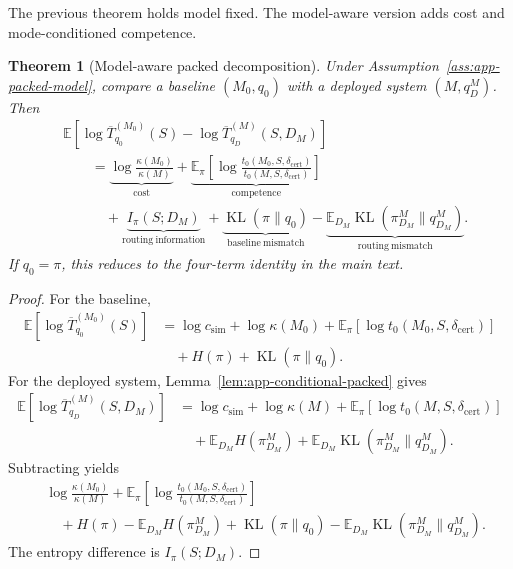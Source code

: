 \documentclass{article}
\newtheorem{theorem}{Theorem}
\DeclareMathOperator{\KL}{KL}
\newcommand{\E}{\mathbb{E}}
\begin{document}
The previous theorem holds model fixed.
The model-aware version adds cost and mode-conditioned competence.

\begin{theorem}[Model-aware packed decomposition]
\label{thm:app-model-aware}
Under Assumption~\ref{ass:app-packed-model}, compare a baseline \((M_0,q_0)\) with a
deployed system \((M,q_D^M)\).
Then
\[
\boxed{
\begin{aligned}
&\E\!\left[
    \log \overline T^{(M_0)}_{q_0}(S)
    -
    \log \overline T^{(M)}_{q_D}(S,D_M)
\right]
\\
&\qquad =
\underbrace{\log\frac{\kappa(M_0)}{\kappa(M)}}_{\mathrm{cost}}
+
\underbrace{
\E_\pi
\left[
    \log\frac{t_0(M_0,S,\delta_{\mathrm{cert}})}
              {t_0(M,S,\delta_{\mathrm{cert}})}
\right]
}_{\mathrm{competence}}
\\
&\qquad\quad
+
\underbrace{I_\pi(S;D_M)}_{\mathrm{routing\ information}}
+
\underbrace{\KL(\pi\|q_0)}_{\mathrm{baseline\ mismatch}}
-
\underbrace{\E_{D_M}\KL(\pi_{D_M}^M\|q_{D_M}^M)}_{\mathrm{routing\ mismatch}} .
\end{aligned}
}
\]
If \(q_0=\pi\), this reduces to the four-term identity in the main text.
\end{theorem}

\begin{proof}
For the baseline,
\[
\begin{aligned}
    \E[\log \overline T^{(M_0)}_{q_0}(S)]
    &=
    \log c_{\mathrm{sim}}
    +
    \log\kappa(M_0)
    +
    \E_\pi[\log t_0(M_0,S,\delta_{\mathrm{cert}})]
    \\
    &\quad
    +
    H(\pi)
    +
    \KL(\pi\|q_0).
\end{aligned}
\]
For the deployed system, Lemma~\ref{lem:app-conditional-packed} gives
\[
\begin{aligned}
    \E[\log \overline T^{(M)}_{q_D}(S,D_M)]
    &=
    \log c_{\mathrm{sim}}
    +
    \log\kappa(M)
    +
    \E_\pi[\log t_0(M,S,\delta_{\mathrm{cert}})]
    \\
    &\quad
    +
    \E_{D_M}H(\pi_{D_M}^M)
    +
    \E_{D_M}\KL(\pi_{D_M}^M\|q_{D_M}^M).
\end{aligned}
\]
Subtracting yields
\[
\begin{aligned}
&\log\frac{\kappa(M_0)}{\kappa(M)}
+
\E_\pi
\left[
    \log\frac{t_0(M_0,S,\delta_{\mathrm{cert}})}
              {t_0(M,S,\delta_{\mathrm{cert}})}
\right]
\\
&\quad+
H(\pi)-\E_{D_M}H(\pi_{D_M}^M)
+
\KL(\pi\|q_0)
-
\E_{D_M}\KL(\pi_{D_M}^M\|q_{D_M}^M).
\end{aligned}
\]
The entropy difference is \(I_\pi(S;D_M)\).
\end{proof}
\end{document}
